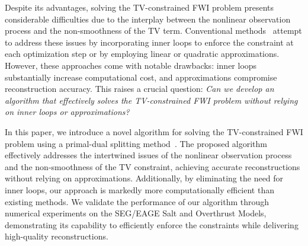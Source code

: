 Despite its advantages, solving the TV-constrained FWI problem presents considerable difficulties due to the interplay between the nonlinear observation process and the non-smoothness of the TV term.
Conventional methods~\mbox{\cite{FWI-with-TV-constraint,FWI-with-TV-constraint2,FWI-with-TV-constraint3,FWI-with-TV-constraint4}} attempt to address these issues by incorporating inner loops to enforce the constraint at each optimization step or by employing linear or quadratic approximations.
However, these approaches come with notable drawbacks: inner loops substantially increase computational cost, and approximations compromise reconstruction accuracy.
This raises a crucial question: \textit{Can we develop an algorithm that effectively solves the TV-constrained FWI problem without relying on inner loops or approximations?}

In this paper, we introduce a novel algorithm for solving the TV-constrained FWI problem using a primal-dual splitting method~\cite{PDS2}.
The proposed algorithm effectively addresses the intertwined issues of the nonlinear observation process and the non-smoothness of the TV constraint, achieving accurate reconstructions without relying on approximations.
Additionally, by eliminating the need for inner loops, our approach is markedly more computationally efficient than existing methods.
We validate the performance of our algorithm through numerical experiments on the SEG/EAGE Salt and Overthrust Models, demonstrating its capability to efficiently enforce the constraints while delivering high-quality reconstructions.
